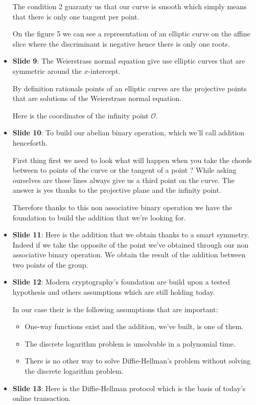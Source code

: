 \begin{itemize}
            The condition 2 guaranty us that our curve is smooth which simply means that
            there is only one tangent per point.

            On the figure 5 we can see a representation of an elliptic curve on the affine
            slice where the discriminant is negative hence there is only one roots.
        \item \textbf{Slide 9}: The Weierstrass normal equation give use elliptic
            curves that are symmetric around the $x$-intercept.

            By definition rationals points of an elliptic curves are the projective points
            that are solutions of the Weierstrass normal equation.

            Here is the coordinates of the infinity point $\mathcal{O}$.
        \item \textbf{Slide 10}: To build our abelian binary operation, which we'll call
            addition henceforth.

            First thing first we need to
            look what will happen when you take the chords between to points of the curve or
            the tangent of a point ? While asking ourselves are these lines always give us a third
            point on the curve. The answer is yes thanks to the projective plane and the
            infinity point.

            Therefore thanks to this non associative binary operation we have the foundation
            to build the addition that we're looking for.
        \item \textbf{Slide 11}: Here is the addition that we obtain
            thanks to a smart symmetry. Indeed if we take the opposite of the point we've
            obtained
            through our non associative binary operation. We obtain the result of the addition between two
            points of the group.
        \item \textbf{Slide 12}: Modern cryptography's foundation are
            build upon a tested hypothesis and others assumptions which are still
            holding today.
            
            In our case their is the following assumptions that are important:
            \begin{itemize}
                \item One-way functions exist and the addition, we've built, is one of them.
                \item The discrete logarithm problem is unsolvable in a polynomial time.
                \item There is no other way to solve Diffie-Hellman's problem without solving
                    the discrete logarithm problem.
            \end{itemize}
        \item \textbf{Slide 13}: Here is the Diffie-Hellman protocol which is the
            basis of today's online transaction.


\end{itemize}
